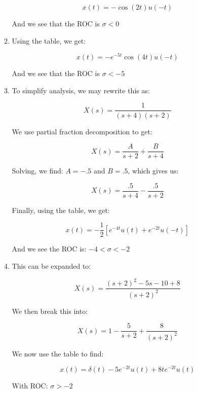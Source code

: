 \begin{enumerate}
\begin{enumerate}
        $$\boxed{x(t)=-\cos(2t)u(-t)}$$

        And we see that the ROC is $\boxed{\sigma<0}$

      \item Using the table, we get:

        $$\boxed{x(t)=-e^{-5t}\cos(4t)u(-t)}$$

        And we see that the ROC is $\boxed{\sigma<-5}$

      \item To simplify analysis, we may rewrite this as:

        $$X(s)=\frac{1}{(s+4)(s+2)}$$

        We use partial fraction decomposition to get:

        $$X(s)=\frac{A}{s+2}+\frac{B}{s+4}$$

        Solving, we find: $A=-.5$ and $B=.5$, which gives us:

        $$X(s)=\frac{.5}{s+4}-\frac{.5}{s+2}$$

        Finally, using the table, we get:

        $$\boxed{x(t)=-\frac{1}{2}\left[ e^{-4t}u(t)+e^{-2t}u(-t) \right]}$$

        And we see the ROC is: $\boxed{-4<\sigma<-2}$

      \item This can be expanded to:

        $$X(s)=\frac{(s+2)^2-5s-10+8}{(s+2)^2}$$

        We then break this into:

        $$X(s)=1-\frac{5}{s+2}+\frac{8}{(s+2)^2}$$

        We now use the table to find:

        $$\boxed{x(t)=\delta(t)-5e^{-2t}u(t)+8te^{-2t}u(t)}$$

        With ROC: $\boxed{\sigma>-2}$

    \end{enumerate}

\end{enumerate}



